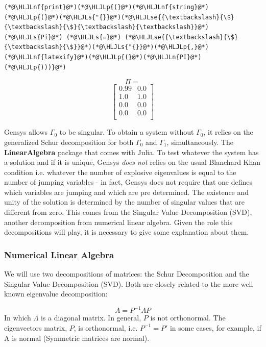 \documentclass[12pt,a4paper]{article}
\newcommand{\HLJLn}[1]{#1}
\newcommand{\HLJLnf}[1]{\textcolor[RGB]{66,102,213}{#1}}
\newcommand{\HLJLs}[1]{\textcolor[RGB]{201,61,57}{#1}}
\newcommand{\HLJLse}[1]{\textcolor[RGB]{59,151,46}{#1}}
\newcommand{\HLJLp}[1]{#1}
\begin{document}
\begin{lstlisting}
(*@\HLJLnf{print}@*)(*@\HLJLp{(}@*)(*@\HLJLnf{string}@*)(*@\HLJLp{(}@*)(*@\HLJLs{"{}}@*)(*@\HLJLse{{\textbackslash}{\$}{\textbackslash}{\$}{\textbackslash}{\textbackslash}}@*)(*@\HLJLs{Pi}@*) (*@\HLJLs{=}@*) (*@\HLJLse{{\textbackslash}{\$}{\textbackslash}{\$}}@*)(*@\HLJLs{"{}}@*)(*@\HLJLp{,}@*)(*@\HLJLnf{latexify}@*)(*@\HLJLp{(}@*)(*@\HLJLn{PI}@*)(*@\HLJLp{)))}@*)
\end{lstlisting}

$$\Pi = $$\begin{equation}
\left[
\begin{array}{cc}
0.99 & 0.0 \\
1.0 & 1.0 \\
0.0 & 0.0 \\
0.0 & 0.0 \\
\end{array}
\right]
\end{equation}


Gensys allows $\Gamma_0$ to be singular. To obtain a system without $\Gamma_0$, it relies on the generalized Schur decomposition for both $\Gamma_0$ and $\Gamma_1$, simultaneously. The \textbf{LinearAlgebra} package that comes with Julia. To test whatever the system has a solution and if it is unique, Gensys \emph{does not} relies on the usual Blanchard Khan condition i.e. whatever the number of explosive eigenvalues is equal to the number of jumping variables - in fact, Gensys does not require that one defines which variables are jumping and which are pre determined. The existence and unity of the solution is determined by the number of singular values that are different from zero. This comes from the Singular Value Decomposition (SVD), another decomposition from numerical linear algebra. Given the role this decompositions will play, it is necessary to give some explanation about them.

\subsubsection{Numerical Linear Algebra}
We will use two decompositions of matrices: the Schur Decomposition and the Singular Value Decomposition (SVD). Both are closely related to the more well known eigenvalue decomposition:

\[
A = P^{-1}\Lambda P
\]
In which $\Lambda$ is a diagonal matrix. In general, $P$ is not orthonormal. The eigenvectors matrix, $P$, is orthonormal, i.e. $P^{-1} = P'$ in some cases, for example, if A is normal (Symmetric matrices are normal).
\end{document}
